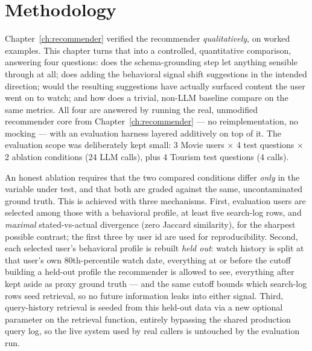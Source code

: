 \section{Methodology}
\label{sec:eval-method}

Chapter~\ref{ch:recommender} verified the recommender \emph{qualitatively}, on worked examples. This
chapter turns that into a controlled, quantitative comparison, answering four questions: does the
schema-grounding step let anything sensible through at all; does adding the behavioral signal shift
suggestions in the intended direction; would the resulting suggestions have actually surfaced
content the user went on to watch; and how does a trivial, non-LLM baseline compare on the same
metrics. All four are answered by running the real, unmodified recommender core from
Chapter~\ref{ch:recommender} --- no reimplementation, no mocking --- with an evaluation harness
layered additively on top of it. The evaluation scope was deliberately kept small: 3 Movie users
$\times$ 4 test questions $\times$ 2 ablation conditions (24 LLM calls), plus 4 Tourism test
questions (4 calls).

An honest ablation requires that the two compared conditions differ \emph{only} in the variable
under test, and that both are graded against the same, uncontaminated ground truth. This is
achieved with three mechanisms. First, evaluation users are selected among those with a behavioral
profile, at least five search-log rows, and \emph{maximal} stated-vs-actual divergence (zero
Jaccard similarity), for the sharpest possible contrast; the first three by user id are used for
reproducibility. Second, each selected user's behavioral profile is rebuilt \emph{held out}: watch
history is split at that user's own 80th-percentile watch date, everything at or before the cutoff
building a held-out profile the recommender is allowed to see, everything after kept aside as proxy
ground truth --- and the same cutoff bounds which search-log rows seed retrieval, so no future
information leaks into either signal. Third, query-history retrieval is seeded from this held-out
data via a new optional parameter on the retrieval function, entirely bypassing the shared
production query log, so the live system used by real callers is untouched by the evaluation run.

